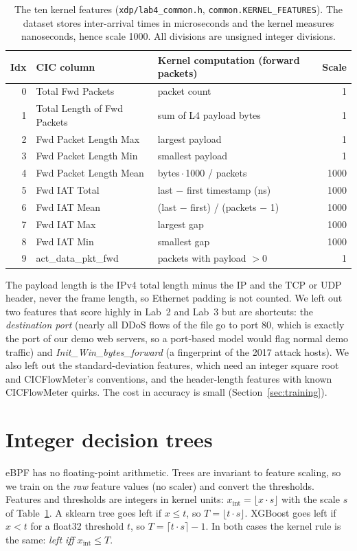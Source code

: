 \begin{table}[htb]
\centering\small
\begin{tabular}{@{}rllr@{}}
\toprule
Idx & CIC column & Kernel computation (forward packets) & Scale\\
\midrule
0 & Total Fwd Packets & packet count & 1\\
1 & Total Length of Fwd Packets & sum of L4 payload bytes & 1\\
2 & Fwd Packet Length Max & largest payload & 1\\
3 & Fwd Packet Length Min & smallest payload & 1\\
4 & Fwd Packet Length Mean & bytes\,$\cdot$\,1000 / packets & 1000\\
5 & Fwd IAT Total & last $-$ first timestamp (ns) & 1000\\
6 & Fwd IAT Mean & (last $-$ first) / (packets $-$ 1) & 1000\\
7 & Fwd IAT Max & largest gap & 1000\\
8 & Fwd IAT Min & smallest gap & 1000\\
9 & act\_data\_pkt\_fwd & packets with payload $>0$ & 1\\
\bottomrule
\end{tabular}
\caption{The ten kernel features (\texttt{xdp/lab4\_common.h}, \texttt{common.KERNEL\_FEATURES}). The dataset stores inter-arrival times in microseconds and the kernel measures nanoseconds, hence scale 1000. All divisions are unsigned integer divisions.}\label{tab:features}
\end{table}

The payload length is the IPv4 total length minus the IP and the TCP or UDP header, never the frame length, so Ethernet padding is not counted. We left out two features that score highly in Lab~2 and Lab~3 but are shortcuts: the \emph{destination port} (nearly all DDoS flows of the file go to port 80, which is exactly the port of our demo web servers, so a port-based model would flag normal demo traffic) and \emph{Init\_Win\_bytes\_forward} (a fingerprint of the 2017 attack hosts). We also left out the standard-deviation features, which need an integer square root and CICFlowMeter's conventions, and the header-length features with known CICFlowMeter quirks. The cost in accuracy is small (Section~\ref{sec:training}).

\section{Integer decision trees}\label{sec:int}
eBPF has no floating-point arithmetic. Trees are invariant to feature scaling, so we train on the \emph{raw} feature values (no scaler) and convert the thresholds. Features and thresholds are integers in kernel units: $x_{\mathrm{int}}=\lfloor x\cdot s\rfloor$ with the scale $s$ of Table~\ref{tab:features}. A sklearn tree goes left if $x\le t$, so $T=\lfloor t\cdot s\rfloor$. XGBoost goes left if $x<t$ for a float32 threshold $t$, so $T=\lceil t\cdot s\rceil-1$. In both cases the kernel rule is the same: \emph{left iff} $x_{\mathrm{int}}\le T$.

